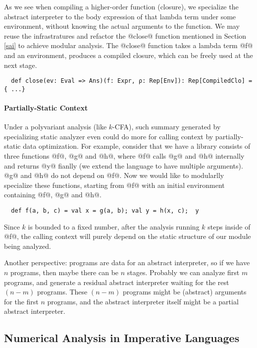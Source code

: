 As we see when compiling a higher-order function (closure), we specialize the
abstract interpreter to the body expression of that lambda term under some
environment, without knowing the actual arguments to the function. We may reuse
the infrastratures and refactor the @close@ function mentioned in Section
\ref{sai} to achieve modular analysis. The @close@ function takes a lambda term
@f@ and an environment, produces a compiled closure, which can be freely used at
the next stage.

\begin{lstlisting}
  def close(ev: Eval => Ans)(f: Expr, ρ: Rep[Env]): Rep[CompiledClo] = { ...}
\end{lstlisting}

\paragraph{Partially-Static Context} Under a polyvariant analysis (like
$k$-CFA), such summary generated by specializing static analyzer even could do
more for calling context by partially-static data optimization. For example,
consider that we have a library consists of three functions @f@, @g@ and @h@,
where @f@ calls @g@ and @h@ internally and returns @y@ fianlly (we extend the
language to have multiple arguments). @g@ and @h@ do not depend on @f@. Now we
would like to modularlly specialize these functions, starting from @f@ with an
initial environment containing @f@, @g@ and @h@.

\begin{lstlisting}
  def f(a, b, c) = val x = g(a, b); val y = h(x, c);  y
\end{lstlisting}

Since $k$ is bounded to a fixed number, after the analysis running $k$ steps
inside of @f@, the calling context will purely depend on the static structure of
our module being analyzed.

\iffalse
Another perspective: programs are data for an abstract interpreter, so if we
have $n$ programs, then maybe there can be $n$ stages. Probably we can analyze
first $m$ programs, and generate a residual abstract interpreter waiting for the
rest $(n-m)$ programs. These $(n-m)$ programs might be (abstract) arguments for
the first $n$ programs, and the abstract interpreter itself might be a partial
abstract interpreter.

\subsection{Numerical Analysis in Imperative Languages} \label{cases_imp}

